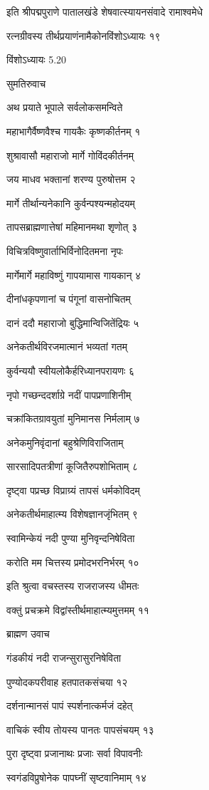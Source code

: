 इति श्रीपद्मपुराणे पातालखंडे शेषवात्स्यायनसंवादे रामाश्वमेधे

रत्नग्रीवस्य तीर्थप्रयाणंनामैकोनविंशोऽध्यायः १९

विंशोऽध्यायः 5.20

सुमतिरुवाच

अथ प्रयाते भूपाले सर्वलोकसमन्विते

महाभागैर्वैष्णवैश्च गायकैः कृष्णकीर्तनम् १

शुश्रावासौ महाराजो मार्गे गोविंदकीर्तनम्

जय माधव भक्तानां शरण्य पुरुषोत्तम २

मार्गे तीर्थान्यनेकानि कुर्वन्पश्यन्महोदयम्

तापसब्राह्मणात्तेषां महिमानमथा शृणोत् ३

विचित्रविष्णुवार्ताभिर्विनोदितमना नृपः

मार्गेमार्गे महाविष्णुं गापयामास गायकान् ४

दीनांधकृपणानां च पंगूनां वासनोचितम्

दानं ददौ महाराजो बुद्धिमान्विजितेंद्रियः ५

अनेकतीर्थविरजमात्मानं भव्यतां गतम्

कुर्वन्ययौ स्वीयलोकैर्हरिध्यानपरायणः ६

नृपो गच्छन्ददर्शाग्रे नदीं पापप्रणाशिनीम्

चक्रांकितग्रावयुतां मुनिमानस निर्मलाम् ७

अनेकमुनिवृंदानां बहुश्रेणिविराजिताम्

सारसादिपतत्रीणां कूजितैरुपशोभिताम् ८

दृष्ट्वा पप्रच्छ विप्राग्र्यं तापसं धर्मकोविदम्

अनेकतीर्थमाहात्म्य विशेषज्ञानजृंभितम् ९

स्वामिन्केयं नदी पुण्या मुनिवृन्दनिषेविता

करोति मम चित्तस्य प्रमोदभरनिर्भरम् १०

इति श्रुत्वा वचस्तस्य राजराजस्य धीमतः

वक्तुं प्रचक्रमे विद्वांस्तीर्थमाहात्म्यमुत्तमम् ११

ब्राह्मण उवाच

गंडकीयं नदी राजन्सुरासुरनिषेविता

पुण्योदकपरीवाह हतपातकसंचया १२

दर्शनान्मानसं पापं स्पर्शनात्कर्मजं दहेत्

वाचिकं स्वीय तोयस्य पानतः पापसंचयम् १३

पुरा दृष्ट्वा प्रजानाथः प्रजाः सर्वा विपावनीः

स्वगंडविप्रुषोनेक पापघ्नीं सृष्टवानिमाम् १४

